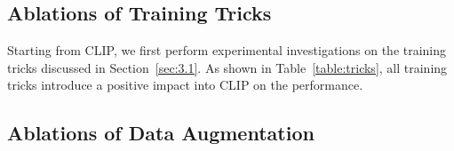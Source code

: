 \documentclass[letterpaper]{article} %
\begin{document}
\begin{table}[t]
\setlength{\abovecaptionskip}{-0.01cm}
\begin{center}
{\caption{Ablations of training tricks on CUHK-PEDES. CLIP$^*$ represents CLIP with all four training trick.}\label{table:tricks}}
\end{center}
\vspace{-0.5cm}
\end{table}

\subsection{Ablations of Training Tricks} \label{sec:4.3}

Starting from CLIP, we first perform experimental investigations on the training tricks discussed in Section~\ref{sec:3.1}. 
As shown in Table~\ref{table:tricks}, all training tricks introduce a positive impact into CLIP on the performance.

\subsection{Ablations of Data Augmentation}\label{sec:exp-aug}
\end{document}
